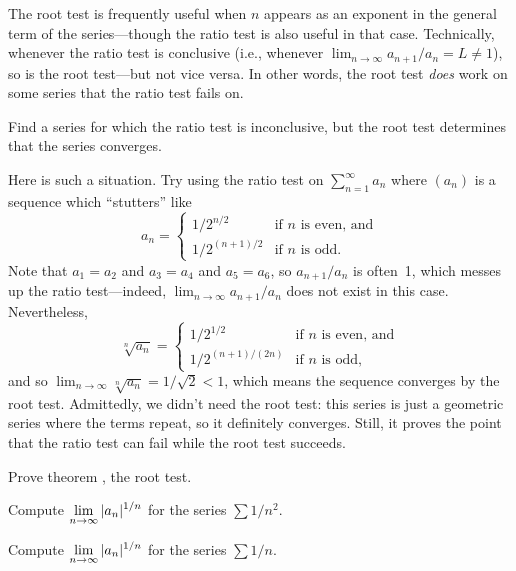 The root test is frequently useful when $n$ appears as an exponent in
the general term of the series---though the ratio test is also useful
in that case.  Technically, whenever the ratio test is conclusive
(i.e., whenever $\lim_{n\to\infty} a_{n+1} / a_n = L \neq 1$), so is
the root test---but not vice versa.  In other words, the root test
\textit{does} work on some series that the ratio test fails on.

\begin{example}
\label{example:root-test-beats-ratio-test}
Find a series for which the ratio test is inconclusive, but the root test determines that the series converges.
\end{example}

\begin{solution}
Here is such a situation.  Try using the ratio test on
$\sum_{n=1}^\infty a_n$ where $(a_n)$ is a sequence which ``stutters''
like
$$
a_n = \begin{cases}
1/2^{n/2} & \mbox{if $n$ is even, and} \\
1/2^{(n+1)/2} & \mbox{if $n$ is odd.} 
\end{cases}
$$
Note that $a_1 = a_2$ and $a_3 = a_4$ and $a_5 = a_6$, so
$a_{n+1}/a_n$ is often~1, which messes up the ratio test---indeed,
$\lim_{n \to \infty} a_{n+1}/a_n$ does not exist in this case.
Nevertheless,
$$
\sqrt[n]{a_n} = \begin{cases}
1/2^{1/2} & \mbox{if $n$ is even, and} \\
1/2^{(n+1)/(2n)} & \mbox{if $n$ is odd,} 
\end{cases}
$$
and so $\lim_{n \to\infty} \sqrt[n]{a_n} = 1/\sqrt{2} < 1$, which
means the sequence converges by the root test.  Admittedly, we didn't
need the root test: this series is just a geometric series where the
terms repeat, so it definitely converges.  Still, it proves the point
that the ratio test can fail while the root test succeeds.
\end{solution}

\begin{exercises}
\begin{exercise}
Prove theorem , the root test.\end{exercise}

\begin{exercise} Compute $\displaystyle\lim_{n\to\infty} |a_n|^{1/n}$ for the series
$\sum 1/n^2$.
\end{exercise}

\begin{exercise} Compute $\displaystyle\lim_{n\to\infty} |a_n|^{1/n}$ for the series
$\sum 1/n$.
\end{exercise}

\end{exercises}
